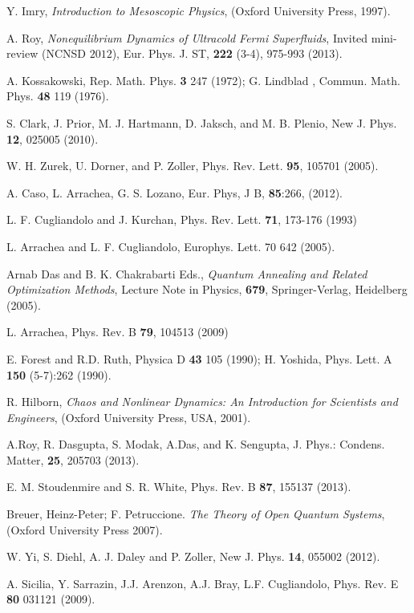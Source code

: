 \documentclass[a4paper,11pt,color]{article}
\renewenvironment{thebibliography}[1]{%
    \begin{oldthebibliography}{#1}%
      \setlength{\parskip}{0ex}%
      \setlength{\itemsep}{0ex}%
  }%
  {%
    \end{oldthebibliography}%
  }
\begin{document}
\begin{thebibliography}{}
Y. Imry, \textit{Introduction to Mesoscopic Physics}, (Oxford University Press, 1997).

A. Roy, \textit{Nonequilibrium Dynamics of Ultracold Fermi Superfluids}, Invited mini-review (NCNSD $2012$),
Eur. Phys. J. ST, {\bf 222} (3-4), 975-993 (2013).

A. Kossakowski, Rep. Math. Phys. {\bf 3} 247 (1972); G. Lindblad , Commun. Math. Phys. {\bf 48} 119 (1976).

S. Clark, J. Prior, M. J. Hartmann, D. Jaksch, and M. B. Plenio, New J. Phys. {\bf 12}, 025005 (2010).

W. H. Zurek, U. Dorner, and P. Zoller, Phys. Rev. Lett. {\bf 95}, 105701 (2005).

A. Caso, L. Arrachea, G. S. Lozano, Eur. Phys, J B, {\bf 85}:266, (2012).

L. F. Cugliandolo and J. Kurchan, Phys. Rev. Lett. {\bf 71}, 173-176 (1993) 

L. Arrachea and L. F. Cugliandolo, Europhys. Lett. 70 642 (2005).

Arnab Das and B. K. Chakrabarti Eds., \textit{Quantum Annealing and Related Optimization Methods}, Lecture Note in Physics, {\bf 679}, Springer-Verlag, Heidelberg (2005).

L. Arrachea, Phys. Rev. B {\bf 79}, 104513 (2009) 

E. Forest and R.D. Ruth, Physica D {\bf 43} 105 (1990); H. Yoshida, Phys. Lett. A {\bf 150} (5-7):262 (1990).

R. Hilborn, \textit{Chaos and Nonlinear Dynamics: An Introduction for Scientists and Engineers}, (Oxford University Press, USA, 2001).

A.Roy, R. Dasgupta, S. Modak, A.Das, and K. Sengupta,  J. Phys.: Condens. Matter, {\bf 25}, 205703 (2013).

E. M. Stoudenmire and S. R. White, Phys. Rev. B {\bf 87}, 155137 (2013).

Breuer, Heinz-Peter; F. Petruccione. \textit{The Theory of Open Quantum Systems}, (Oxford University Press 2007).

W. Yi, S. Diehl, A. J. Daley and P. Zoller, New J. Phys. {\bf 14}, 055002 (2012).

A. Sicilia, Y. Sarrazin, J.J. Arenzon, A.J. Bray, L.F. Cugliandolo, Phys. Rev. E {\bf 80} 031121 (2009).


\end{thebibliography}
\end{document}
